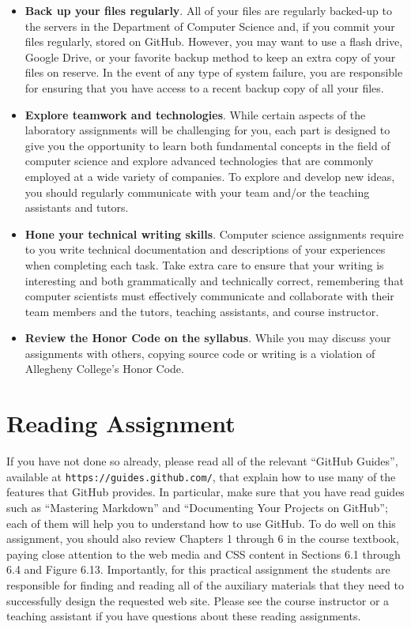 \documentclass[11pt]{article}
\newcommand{\url}[1]{\lstinline{#1}}
\begin{document}
\begin{itemize}
\item {\bf Back up your files regularly}. All of your files are regularly backed-up to the servers in the Department of
  Computer Science and, if you commit your files regularly, stored on GitHub. However, you may want to use a flash
  drive, Google Drive, or your favorite backup method to keep an extra copy of your files on reserve. In the event of
  any type of system failure, you are responsible for ensuring that you have access to a recent backup copy of all your
  files.

\item {\bf Explore teamwork and technologies}. While certain aspects of the laboratory assignments will be challenging
  for you, each part is designed to give you the opportunity to learn both fundamental concepts in the field of computer
  science and explore advanced technologies that are commonly employed at a wide variety of companies. To explore and
  develop new ideas, you should regularly communicate with your team and/or the teaching assistants and tutors.

\item {\bf Hone your technical writing skills}. Computer science assignments require to you write technical
  documentation and descriptions of your experiences when completing each task. Take extra care to ensure that your
  writing is interesting and both grammatically and technically correct, remembering that computer scientists must
  effectively communicate and collaborate with their team members and the tutors, teaching assistants, and course
  instructor.

\item {\bf Review the Honor Code on the syllabus}. While you may discuss your
  assignments with others, copying source code or writing is a violation of
  Allegheny College's Honor Code.

\end{itemize}

\section*{Reading Assignment}

If you have not done so already, please read all of the relevant ``GitHub
Guides'', available at \url{https://guides.github.com/}, that explain how to use
many of the features that GitHub provides. In particular, make sure that you
have read guides such as ``Mastering Markdown'' and ``Documenting Your Projects
on GitHub''; each of them will help you to understand how to use GitHub. To do
well on this assignment, you should also review Chapters 1 through 6 in the
course textbook, paying close attention to the web media and CSS content in
Sections 6.1 through 6.4 and Figure 6.13. Importantly, for this practical
assignment the students are responsible for finding and reading all of the
auxiliary materials that they need to successfully design the requested web
site. Please see the course instructor or a teaching assistant if you have
questions about these reading assignments.
\end{document}
